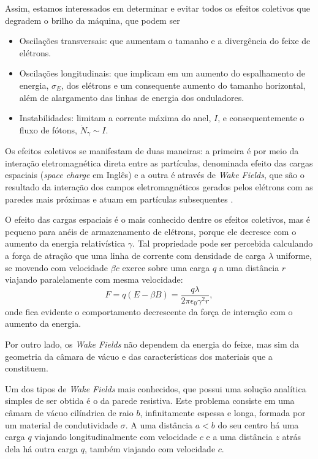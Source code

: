 Assim, estamos interessados em determinar e evitar todos os efeitos coletivos que degradem o brilho da máquina, que podem ser
\begin{itemize}
 \item Oscilações transversais: que aumentam o tamanho e a divergência do feixe de elétrons.
 \item Oscilações longitudinais: que implicam em um aumento do espalhamento de energia, $\sigma_E$, dos elétrons e um consequente aumento do tamanho horizontal, além de alargamento das linhas de energia dos onduladores.
 \item Instabilidades: limitam a corrente máxima do anel, $I$, e consequentemente o fluxo de fótons, $\dot{N}_\gamma \sim I$.
\end{itemize}

Os efeitos coletivos se manifestam de duas maneiras: a primeira é por meio da interação eletromagnética direta entre as partículas, denominada efeito das cargas espaciais (\textit{space charge} em Inglês) e a outra é através de \textit{Wake Fields}, que são o resultado da interação dos campos eletromagnéticos gerados pelos elétrons com as paredes mais próximas e atuam em partículas subsequentes \cite{Khan}.

O efeito das cargas espaciais é o mais conhecido dentre os efeitos coletivos, mas é pequeno para anéis de armazenamento de elétrons, porque ele decresce com o aumento da energia relativística $\gamma$. Tal propriedade pode ser percebida calculando a força de atração que uma linha de corrente com densidade de carga $\lambda$ uniforme, se movendo com velocidade $\beta c$ exerce sobre uma carga $q$  a uma distância $r$ viajando paralelamente com mesma velocidade:
\begin{equation}
 F= q(E - \beta B)=\frac{q\lambda}{2\pi \epsilon_0 \gamma^2 r},
\end{equation}
onde fica evidente o comportamento decrescente da força de interação com o aumento da energia.

Por outro lado, os \textit{Wake Fields} não dependem da energia do feixe, mas sim da geometria da câmara de vácuo e das características dos materiais que a constituem.

Um dos tipos de \textit{Wake Fields} mais conhecidos, que possui uma solução analítica simples de ser obtida é o da parede resistiva. Este problema consiste em uma câmara de vácuo cilíndrica de raio $b$, infinitamente espessa e longa, formada por um material de condutividade $\sigma$. A uma distância $a<b$ do seu centro há uma carga $q$ viajando longitudinalmente com velocidade $c$ e a uma distância $z$ atrás dela há outra carga $q$, também viajando com velocidade $c$.

